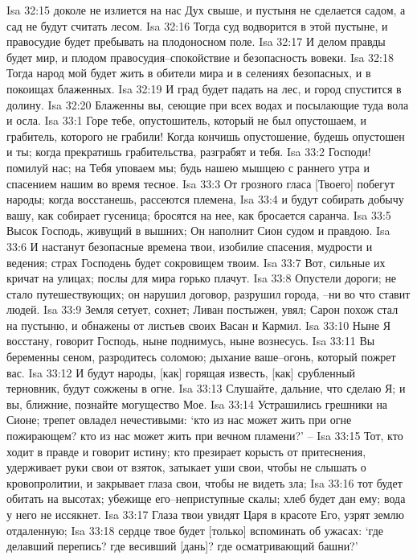 Isa 32:15  доколе не излиется на нас Дух свыше, и пустыня не сделается садом, а сад не будут считать лесом.
Isa 32:16  Тогда суд водворится в этой пустыне, и правосудие будет пребывать на плодоносном поле.
Isa 32:17  И делом правды будет мир, и плодом правосудия--спокойствие и безопасность вовеки.
Isa 32:18  Тогда народ мой будет жить в обители мира и в селениях безопасных, и в покоищах блаженных.
Isa 32:19  И град будет падать на лес, и город спустится в долину.
Isa 32:20  Блаженны вы, сеющие при всех водах и посылающие туда вола и осла.
Isa 33:1  Горе тебе, опустошитель, который не был опустошаем, и грабитель, которого не грабили! Когда кончишь опустошение, будешь опустошен и ты; когда прекратишь грабительства, разграбят и тебя.
Isa 33:2  Господи! помилуй нас; на Тебя уповаем мы; будь нашею мышцею с раннего утра и спасением нашим во время тесное.
Isa 33:3  От грозного гласа [Твоего] побегут народы; когда восстанешь, рассеются племена,
Isa 33:4  и будут собирать добычу вашу, как собирает гусеница; бросятся на нее, как бросается саранча.
Isa 33:5  Высок Господь, живущий в вышних; Он наполнит Сион судом и правдою.
Isa 33:6  И настанут безопасные времена твои, изобилие спасения, мудрости и ведения; страх Господень будет сокровищем твоим.
Isa 33:7  Вот, сильные их кричат на улицах; послы для мира горько плачут.
Isa 33:8  Опустели дороги; не стало путешествующих; он нарушил договор, разрушил города, --ни во что ставит людей.
Isa 33:9  Земля сетует, сохнет; Ливан постыжен, увял; Сарон похож стал на пустыню, и обнажены от листьев своих Васан и Кармил.
Isa 33:10  Ныне Я восстану, говорит Господь, ныне поднимусь, ныне вознесусь.
Isa 33:11  Вы беременны сеном, разродитесь соломою; дыхание ваше--огонь, который пожрет вас.
Isa 33:12  И будут народы, [как] горящая известь, [как] срубленный терновник, будут сожжены в огне.
Isa 33:13  Слушайте, дальние, что сделаю Я; и вы, ближние, познайте могущество Мое.
Isa 33:14  Устрашились грешники на Сионе; трепет овладел нечестивыми: `кто из нас может жить при огне пожирающем? кто из нас может жить при вечном пламени?' --
Isa 33:15  Тот, кто ходит в правде и говорит истину; кто презирает корысть от притеснения, удерживает руки свои от взяток, затыкает уши свои, чтобы не слышать о кровопролитии, и закрывает глаза свои, чтобы не видеть зла;
Isa 33:16  тот будет обитать на высотах; убежище его--неприступные скалы; хлеб будет дан ему; вода у него не иссякнет.
Isa 33:17  Глаза твои увидят Царя в красоте Его, узрят землю отдаленную;
Isa 33:18  сердце твое будет [только] вспоминать об ужасах: `где делавший перепись? где весивший [дань]? где осматривающий башни?'
